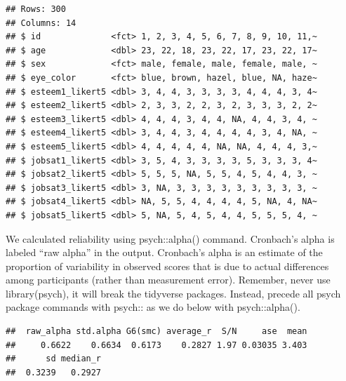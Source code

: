 \documentclass[
]{krantz}
\makeatletter
\newenvironment{Shaded}{\begin{snugshade}}{\end{snugshade}}
\newcommand{\FunctionTok}[1]{\textcolor[rgb]{0,0,0}{#1}}
\newcommand{\NormalTok}[1]{#1}
\newcommand{\OtherTok}[1]{\textcolor[rgb]{0.37,0.37,0.37}{#1}}
\newcommand{\SpecialCharTok}[1]{\textcolor[rgb]{0,0,0}{#1}}
\newcommand{\StringTok}[1]{\textcolor[rgb]{0.5,0.5,0.5}{#1}}
\newenvironment{kframe}{%
\medskip{}
\setlength{\fboxsep}{.8em}
 \def\at@end@of@kframe{}%
 \ifinner\ifhmode%
  \def\at@end@of@kframe{\end{minipage}}%
  \begin{minipage}{\columnwidth}%
 \fi\fi%
 \def\FrameCommand##1{\hskip\@totalleftmargin \hskip-\fboxsep
 \colorbox{shadecolor}{##1}\hskip-\fboxsep
     \hskip-\linewidth \hskip-\@totalleftmargin \hskip\columnwidth}%
 \MakeFramed {\advance\hsize-\width
   \@totalleftmargin\z@ \linewidth\hsize
   \@setminipage}}%
 {\par\unskip\endMakeFramed%
 \at@end@of@kframe}
\renewenvironment{Shaded}{\begin{kframe}}{\end{kframe}}
\makeatother
\begin{document}
\begin{verbatim}
## Rows: 300
## Columns: 14
## $ id              <fct> 1, 2, 3, 4, 5, 6, 7, 8, 9, 10, 11,~
## $ age             <dbl> 23, 22, 18, 23, 22, 17, 23, 22, 17~
## $ sex             <fct> male, female, male, female, male, ~
## $ eye_color       <fct> blue, brown, hazel, blue, NA, haze~
## $ esteem1_likert5 <dbl> 3, 4, 4, 3, 3, 3, 3, 4, 4, 4, 3, 4~
## $ esteem2_likert5 <dbl> 2, 3, 3, 2, 2, 3, 2, 3, 3, 3, 2, 2~
## $ esteem3_likert5 <dbl> 4, 4, 4, 3, 4, 4, NA, 4, 4, 3, 4, ~
## $ esteem4_likert5 <dbl> 3, 4, 4, 3, 4, 4, 4, 4, 3, 4, NA, ~
## $ esteem5_likert5 <dbl> 4, 4, 4, 4, 4, NA, NA, 4, 4, 4, 3,~
## $ jobsat1_likert5 <dbl> 3, 5, 4, 3, 3, 3, 3, 5, 3, 3, 3, 4~
## $ jobsat2_likert5 <dbl> 5, 5, 5, NA, 5, 5, 4, 5, 4, 4, 3, ~
## $ jobsat3_likert5 <dbl> 3, NA, 3, 3, 3, 3, 3, 3, 3, 3, 3, ~
## $ jobsat4_likert5 <dbl> NA, 5, 5, 4, 4, 4, 4, 5, NA, 4, NA~
## $ jobsat5_likert5 <dbl> 5, NA, 5, 4, 5, 4, 4, 5, 5, 5, 4, ~
\end{verbatim}

We calculated reliability using psych::alpha() command. Cronbach's alpha is labeled ``raw alpha'' in the output. Cronbach's alpha is an estimate of the proportion of variability in observed scores that is due to actual differences among participants (rather than measurement error). Remember, never use library(psych), it will break the tidyverse packages. Instead, precede all psych package commands with psych:: as we do below with psych::alpha().

\begin{Shaded}
\end{Shaded}

\begin{verbatim}
##  raw_alpha std.alpha G6(smc) average_r  S/N     ase  mean
##     0.6622    0.6634  0.6173    0.2827 1.97 0.03035 3.403
##      sd median_r
##  0.3239   0.2927
\end{verbatim}

  

\backmatter
\printindex
\end{document}
